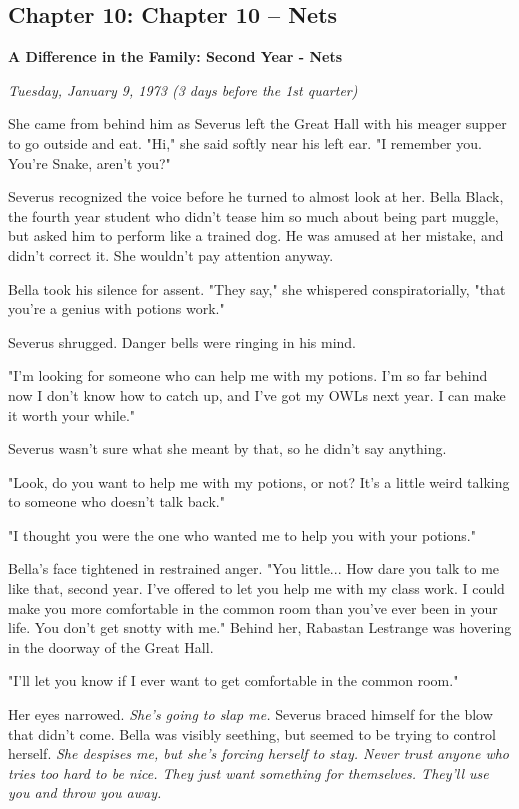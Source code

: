 \documentclass[a4paper,11pt]{article}
\begin{document}
\subsection{Chapter 10: Chapter 10 – Nets}

\textbf{A Difference in the Family: Second Year - Nets}

\emph{Tuesday, January 9, 1973 (3 days before the 1st quarter)}

She came from behind him as Severus left the Great Hall with his meager supper to go outside and eat. "Hi," she said softly near his left ear. "I remember you. You're Snake, aren't you?"

Severus recognized the voice before he turned to almost look at her. Bella Black, the fourth year student who didn't tease him so much about being part muggle, but asked him to perform like a trained dog. He was amused at her mistake, and didn't correct it. She wouldn't pay attention anyway.

Bella took his silence for assent. "They say," she whispered conspiratorially, "that you're a genius with potions work."

Severus shrugged. Danger bells were ringing in his mind.

"I'm looking for someone who can help me with my potions. I'm so far behind now I don't know how to catch up, and I've got my OWLs next year. I can make it worth your while."

Severus wasn't sure what she meant by that, so he didn't say anything.

"Look, do you want to help me with my potions, or not? It's a little weird talking to someone who doesn't talk back."

"I thought you were the one who wanted me to help you with your potions."

Bella's face tightened in restrained anger. "You little... How dare you talk to me like that, second year. I've offered to let you help me with my class work. I could make you more comfortable in the common room than you've ever been in your life. You don't get snotty with me." Behind her, Rabastan Lestrange was hovering in the doorway of the Great Hall.

"I'll let you know if I ever want to get comfortable in the common room."

Her eyes narrowed. \emph{She's going to slap me.} Severus braced himself for the blow that didn't come. Bella was visibly seething, but seemed to be trying to control herself. \emph{She despises me, but she's forcing herself to stay. Never trust anyone who tries too hard to be nice. They just want something for themselves. They'll use you and throw you away.}
\end{document}
